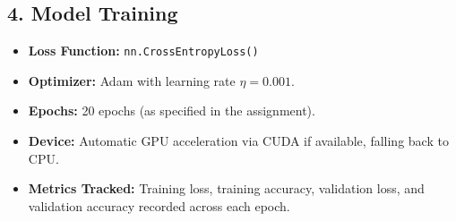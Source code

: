 \documentclass[11pt]{article}
\providecommand{\tightlist}{%
      \setlength{\itemsep}{0pt}\setlength{\parskip}{0pt}}
\begin{document}
    \subsection{4. Model Training}\label{model-training}

\begin{itemize}
\tightlist
\item
  \textbf{Loss Function:} \texttt{nn.CrossEntropyLoss()}
\item
  \textbf{Optimizer:} Adam with learning rate \(\eta = 0.001\).
\item
  \textbf{Epochs:} 20 epochs (as specified in the assignment).
\item
  \textbf{Device:} Automatic GPU acceleration via CUDA if available,
  falling back to CPU.
\item
  \textbf{Metrics Tracked:} Training loss, training accuracy, validation
  loss, and validation accuracy recorded across each epoch.
\end{itemize}
\end{document}
